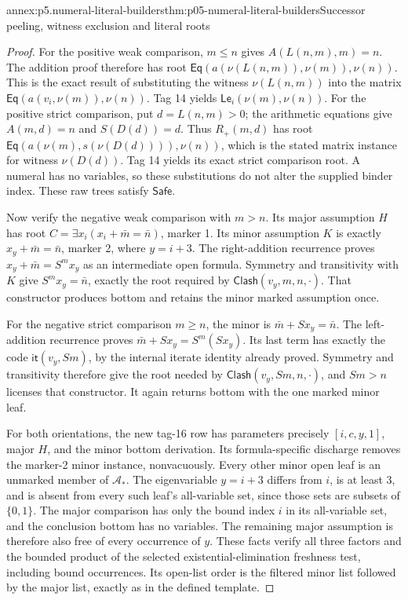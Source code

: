 \begin{annexitem}{annex:p5.numeral-literal-builders}{thm:p05-numeral-literal-builders}{Successor peeling, witness exclusion and literal roots}
\begin{proof}
For the positive weak comparison, \(m\leq n\) gives
\(A(L(n,m),m)=n\). The addition proof therefore has root
\(\mathsf{Eq}(a(\nu(L(n,m)),\nu(m)),\nu(n))\). This is the exact result of
substituting the witness \(\nu(L(n,m))\) into the matrix
\(\mathsf{Eq}(a(v_i,\nu(m)),\nu(n))\). Tag 14 yields
\(\mathsf{Le}_i(\nu(m),\nu(n))\). For the positive strict comparison,
put \(d=L(n,m)>0\); the arithmetic equations give \(A(m,d)=n\) and
\(S(D(d))=d\). Thus \(R_+(m,d)\) has root
\(\mathsf{Eq}(a(\nu(m),s(\nu(D(d)))),\nu(n))\), which is the stated matrix
instance for witness \(\nu(D(d))\). Tag 14 yields its exact strict
comparison root. A numeral has no variables, so these substitutions do not
alter the supplied binder index. These raw trees satisfy \(\mathsf{Safe}\).

Now verify the negative weak comparison with \(m>n\). Its major assumption
\(H\) has root \(C=\exists x_i(x_i+\bar m=\bar n)\), marker 1.
Its minor assumption \(K\) is exactly
\(x_y+\bar m=\bar n\), marker 2, where \(y=i+3\).
The right-addition recurrence proves
\(x_y+\bar m=S^m x_y\) as an intermediate open formula. Symmetry and
transitivity with \(K\) give \(S^m x_y=\bar n\), exactly the root
required by \(\mathsf{Clash}(v_y,m,n,\cdot)\). That constructor produces
bottom and retains the minor marked assumption once.

For the negative strict comparison \(m\geq n\), the minor is
\(\bar m+Sx_y=\bar n\). The left-addition recurrence proves
\(\bar m+Sx_y=S^m(Sx_y)\). Its last term has exactly the code
\(\mathsf{it}(v_y,Sm)\), by the internal iterate identity already proved.
Symmetry and transitivity therefore give the root needed by
\(\mathsf{Clash}(v_y,Sm,n,\cdot)\), and \(Sm>n\) licenses that
constructor. It again returns bottom with the one marked minor leaf.

For both orientations, the new tag-16 row has parameters precisely
\([i,c,y,1]\), major \(H\), and the minor bottom derivation. Its
formula-specific discharge removes the marker-2 minor instance, nonvacuously.
Every other minor open leaf is an unmarked member of \(\mathcal A_*\).
The eigenvariable \(y=i+3\) differs from \(i\), is at least 3, and is
absent from every such leaf's all-variable set, since those sets are subsets
of \(\{0,1\}\). The major comparison has only the bound index \(i\)
in its all-variable set, and the conclusion bottom has no variables.
The remaining major assumption is therefore also free of every occurrence
of \(y\). These facts verify all three factors and the bounded product
of the selected existential-elimination freshness test, including bound
occurrences. Its open-list order is the filtered minor list followed by the
major list, exactly as in the defined template.


\end{proof}
\end{annexitem}
